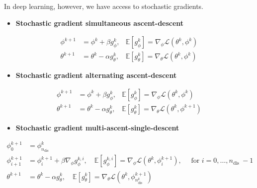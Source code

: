\documentclass{report}
\begin{document}
\begin{definition}
    In deep learning, however, we have access to stochastic gradients.

    \begin{itemize}
        \item \textbf{Stochastic gradient simultaneous ascent-descent}
    \end{itemize}

    $$
    \begin{aligned}
    \phi^{k+1} & =\phi^{k}+\beta g_{\phi}^{k}, & \mathbb{E}\left[g_{\phi}^{k}\right]=\nabla_{\phi} \mathcal{L}\left(\theta^{k}, \phi^{k}\right) \\
    \theta^{k+1} & =\theta^{k}-\alpha g_{\theta}^{k}, & \mathbb{E}\left[g_{\theta}^{k}\right]=\nabla_{\theta} \mathcal{L}\left(\theta^{k}, \phi^{k}\right)
    \end{aligned}
    $$

    \begin{itemize}
        \item \textbf{Stochastic gradient alternating ascent-descent}
    \end{itemize}

    $$
    \begin{aligned}
    \phi^{k+1} & =\phi^{k}+\beta g_{\phi}^{k}, & \mathbb{E}\left[g_{\phi}^{k}\right]=\nabla_{\phi} \mathcal{L}\left(\theta^{k}, \phi^{k}\right) \\
    \theta^{k+1} & =\theta^{k}-\alpha g_{\theta}^{k}, & \mathbb{E}\left[g_{\theta}^{k}\right]=\nabla_{\theta} \mathcal{L}\left(\theta^{k}, \phi^{k+1}\right)
    \end{aligned}
    $$

    \begin{itemize}
        \item \textbf{Stochastic gradient multi-ascent-single-descent}
    \end{itemize}

    $$
    \begin{aligned}
    \phi_{0}^{k+1} & =\phi_{n_{\text {dis }}}^{k} \\
    \phi_{i+1}^{k+1} & =\phi_{i}^{k+1}+\beta \nabla_{\phi} g_{\phi}^{k, i}, \quad \mathbb{E}\left[g_{\phi}^{k, i}\right]=\nabla_{\phi} \mathcal{L}\left(\theta^{k}, \phi_{i}^{k+1}\right), \quad \text { for } i=0, \ldots, n_{\text {dis }}-1 \\
    \theta^{k+1} & =\theta^{k}-\alpha g_{\theta}^{k}, \quad \mathbb{E}\left[g_{\theta}^{k}\right]=\nabla_{\theta} \mathcal{L}\left(\theta^{k}, \phi_{n_{\text {dis }}^{k}}^{k+1}\right)
    \end{aligned}
    $$
\end{definition}
\end{document}
